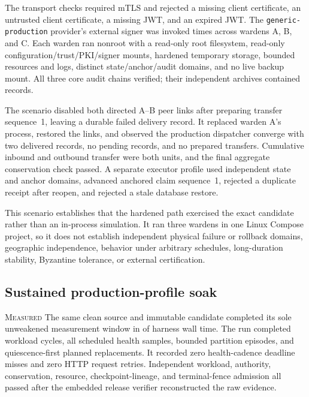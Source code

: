 \documentclass[10pt]{article}
\newcommand{\measured}{\textsc{Measured}}
\newcommand{\code}[1]{\nolinkurl{#1}}
\begin{document}
The transport checks required mTLS and rejected a missing client certificate, an untrusted client
certificate, a missing JWT, and an expired JWT. The \code{generic-production} provider's external
signer was invoked \ProductionSignerInvocations{} times across wardens A, B, and C. Each warden ran
nonroot with a read-only root filesystem, read-only configuration/trust/PKI/signer mounts, hardened
temporary storage, bounded resources and logs, distinct state/anchor/audit domains, and no live
backup mount. All three core audit chains verified; their independent archives contained
\ProductionAuditRecordCounts{} records.

The scenario disabled both directed A--B peer links after preparing transfer sequence~1, leaving a
durable failed delivery record. It replaced warden A's process, restored the links, and observed the
production dispatcher converge with two delivered records, no pending records, and no prepared
transfers. Cumulative inbound and outbound transfer were both \ProductionTransferred{} units, and
the final aggregate conservation check passed. A separate executor profile used independent state
and anchor domains, advanced anchored claim sequence~1, rejected a duplicate receipt after reopen,
and rejected a stale database restore.

This scenario establishes that the hardened path exercised the exact candidate rather than an
in-process simulation. It ran three wardens in one Linux Compose project, so it does not establish
independent physical failure or rollback domains, geographic independence, behavior under
arbitrary schedules, long-duration stability, Byzantine tolerance, or external certification.

\subsection{Sustained production-profile soak}

\measured{} The same clean source and immutable candidate completed its sole unweakened
\SoakMeasurementDuration{} measurement window in \SoakWallDuration{} of harness wall time. The
run completed \SoakCycles{} workload cycles, all \SoakHealthSamples{} scheduled health samples,
\SoakPartitionEpisodes{} bounded partition episodes, and \SoakRestartEpisodes{} quiescence-first
planned replacements. It recorded zero health-cadence deadline misses and zero HTTP request
retries. Independent workload, authority, conservation, resource, checkpoint-lineage, and
terminal-fence admission all passed after the embedded release verifier reconstructed the raw
evidence.
\end{document}
